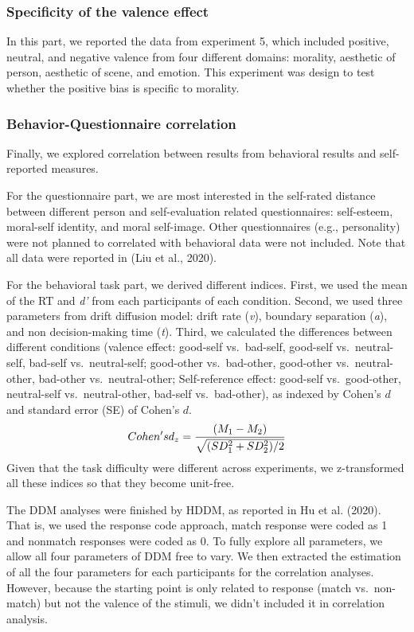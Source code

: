 \documentclass[
  english,
  man]{apa6}
\begin{document}
\hypertarget{specificity-of-the-valence-effect}{%
\subsubsection{Specificity of the valence effect}\label{specificity-of-the-valence-effect}}

In this part, we reported the data from experiment 5, which included positive, neutral, and negative valence from four different domains: morality, aesthetic of person, aesthetic of scene, and emotion. This experiment was design to test whether the positive bias is specific to morality.

\hypertarget{behavior-questionnaire-correlation}{%
\subsubsection{Behavior-Questionnaire correlation}\label{behavior-questionnaire-correlation}}

Finally, we explored correlation between results from behavioral results and self-reported measures.

For the questionnaire part, we are most interested in the self-rated distance between different person and self-evaluation related questionnaires: self-esteem, moral-self identity, and moral self-image. Other questionnaires (e.g., personality) were not planned to correlated with behavioral data were not included. Note that all data were reported in (Liu et al., 2020).

For the behavioral task part, we derived different indices. First, we used the mean of the RT and \emph{d'} from each participants of each condition. Second, we used three parameters from drift diffusion model: drift rate (\emph{v}), boundary separation (\emph{a}), and non decision-making time (\emph{t}). Third, we calculated the differences between different conditions (valence effect: good-self vs.~bad-self, good-self vs.~neutral-self, bad-self vs.~neutral-self; good-other vs.~bad-other, good-other vs.~neutral-other, bad-other vs.~neutral-other; Self-reference effect: good-self vs.~good-other, neutral-self vs.~neutral-other, bad-self vs.~bad-other), as indexed by Cohen's \(d\) and standard error (SE) of Cohen's \(d\).
\[ Cohen's \space d_{z} = \frac {(M_{1} - M_{2})} {\sqrt{(SD_{1}^2 + SD_{2}^2)/2}}\]
Given that the task difficulty were different across experiments, we z-transformed all these indices so that they become unit-free.

The DDM analyses were finished by HDDM, as reported in Hu et al. (2020). That is, we used the response code approach, match response were coded as 1 and nonmatch responses were coded as 0. To fully explore all parameters, we allow all four parameters of DDM free to vary. We then extracted the estimation of all the four parameters for each participants for the correlation analyses. However, because the starting point is only related to response (match vs.~non-match) but not the valence of the stimuli, we didn't included it in correlation analysis.
\end{document}
